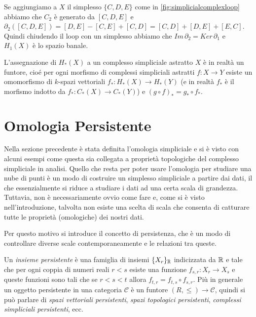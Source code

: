 Se aggiungiamo a $X$ il simplesso $\{C,D,E\}$ come in \cref{fig:simplicialcomplexloop} abbiamo che $C_2$ è generato da $[C,D,E]$ e $\partial_2([C,D,E]) = [D,E] - [C,E] + [C,D] = [C,D] + [D,E] + [E,C]$. Quindi chiudendo il loop con un simplesso abbiamo che
$Im\,\partial_2 = Ker\,\partial_1$ e $H_1(X)$ è lo spazio banale.

\begin{rmk}
  L'assegnazione di $H_*(X)$ a un complesso simpliciale astratto $X$ è in realtà un funtore, cioé per ogni morfismo di complessi simpliciali astratti $f:X\to Y$ esiste un omomorfismo di $k$-spazi vettoriali $f_*:H_*(X)\to H_*(Y)$ (e in realtà $f_*$ è il morfismo indotto da $f_*:C_*(X)\to C_*(Y)$) e $(g\circ f)_* = g_* \circ f_*$.
\end{rmk}

\section{Omologia Persistente}\label{sec:persistenthomology}

Nella sezione precedente è stata definita l'omologia simpliciale e si è visto con alcuni esempi come questa sia collegata a proprietà topologiche del complesso simpliciale in analisi. Quello che resta per poter usare l'omologia per studiare una nube di punti è un modo di costruire un simplesso simpliciale a partire dai dati, il che essenzialmente si riduce a studiare i dati ad una certa scala di grandezza. Tuttavia, non è necessariamente ovvio come fare e, come si è visto nell'introduzione, talvolta non esiste una scelta di scala che consenta di catturare tutte le proprietà (omologiche) dei nostri dati.

Per questo motivo si introduce il concetto di persistenza, che è un modo di controllare diverse scale contemporaneamente e le relazioni tra queste.

\begin{definition}\label{def:persistentset}
  Un \emph{insieme persistente} è una famiglia di insiemi $\{X_r\}_{\mathbb{R}}$ indicizzata da $\mathbb{R}$ e tale che per ogni coppia di numeri reali $r<s$ esiste una funzione $f_{s,r}:X_r\to X_s$ e queste funzioni sono tali che se $r< s< t$ allora $f_{t,r} = f_{t,s}\circ f_{s,r}$. Più in generale un oggetto persistente in una categoria $\mathcal{C}$ è un funtore $(R,\leq)\to \mathcal{C}$, quindi si può parlare di \emph{spazi vettoriali persistenti},
  \emph{spazi topologici persistenti}, \emph{complessi simpliciali persistenti}, ecc.
\end{definition}

